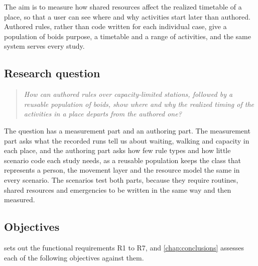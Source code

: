 The aim is to measure how shared resources affect the realized timetable of a place, so that a user can see where and why activities start later than authored. Authored rules, rather than code written for each individual case, give a population of boids purpose, a timetable and a range of activities, and the same system serves every study.

\subsection{Research question}\label{sub:intro-rq}

\begin{quote}
\emph{How can authored rules over capacity-limited stations, followed by a reusable population of boids, show where and why the realized timing of the activities in a place departs from the authored one?}
\end{quote}

The question has a measurement part and an authoring part. The measurement part asks what the recorded runs tell us about waiting, walking and capacity in each place, and the authoring part asks how few rule types and how little scenario code each study needs, as a reusable population keeps the class that represents a person, the movement layer and the resource model the same in every scenario. The scenarios test both parts, because they require routines, shared resources and emergencies to be written in the same way and then measured.

\subsection{Objectives}\label{sub:intro-objectives}

 sets out the functional requirements R1 to R7, and \cref{chap:conclusions} assesses each of the following objectives against them.


